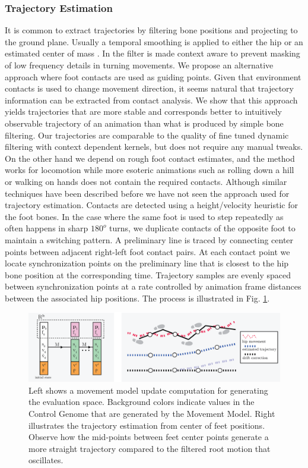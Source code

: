 \subsubsection{\bf Trajectory Estimation}
It is common to extract trajectories by filtering bone positions and projecting to the ground plane. Usually a temporal smoothing is applied to either the hip \magnus{[ref]} or an estimated center of mass \magnus{[ref]}. In \magnus{[ref]} the filter is made context aware to prevent masking of low frequency details in turning movements. We propose an alternative approach where foot contacts are used as guiding points. Given that environment contacts is used to change movement direction, it seems natural that trajectory information can be extracted from contact analysis. We show that this approach yields trajectories that are more stable and corresponds better to intuitively observable trajectory of an animation than what is produced by simple bone filtering. Our trajectories are comparable to the quality of fine tuned dynamic filtering with context dependent kernels, but does not require any manual tweaks. On the other hand we depend on rough foot contact estimates, and the method works for locomotion while more esoteric animations such as rolling down a hill or walking on hands does not contain the required contacts.
%
Although similar techniques have been described before \magnus{[ref]} we have not seen the approach used for trajectory estimation.
Contacts are detected using a height/velocity heuristic for the foot bones. In the case where the same foot is used to step repeatedly as often happens in sharp $180^o$ turns, we duplicate contacts of the opposite foot to maintain a switching pattern. A preliminary line is traced by connecting center points between adjacent right-left foot contact pairs. At each contact point we locate synchronization points on the preliminary line that is closest to the hip bone position at the corresponding time. Trajectory samples are evenly spaced between synchronization points at a rate controlled by animation frame distances between the associated hip positions. The process is illustrated in Fig. \ref{fig:method:trajectory}. 
\begin{figure}
    \centering
    \includegraphics[width=1\columnwidth]{img/trajectory.png}
    \caption{Left shows a movement model update computation for generating the evaluation space. Background colors indicate values in the Control Genome that are generated by the Movement Model.  Right illustrates the trajectory estimation from center of feet positions. Observe how the mid-points between feet center points generate a more straight trajectory compared to the filtered root motion that oscillates.}
    \label{fig:method:trajectory}
\end{figure}

